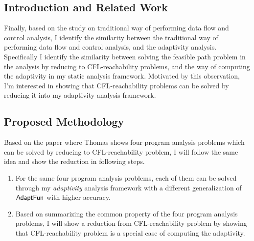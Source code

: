 \subsection{Introduction and Related Work}
\label{subsec:cfl-backgroung}
Finally, based on the study on traditional way of performing data flow and control analysis,
   I identify the similarity between the traditional way of performing data flow and control analysis, and the 
   adaptivity analysis.  
   Specifically I identify the similarity between 
   solving the feasible path problem in the analysis by reducing to CFL-reachability problems,
   and the way of computing the adaptivity in my static analysis framework.
   Motivated by this observation, 
   I'm interested in showing that
   CFL-reachability problems can be solved by reducing it into my adaptivity analysis framework.

\subsection{Proposed Methodology}
\label{subsec:cfl-methodology}
Based on the paper\cite{Reps98} where Thomas shows 
four program analysis problems 
which can be solved by reducing to CFL-reachability problem, I will follow the same idea and show the reduction
in following steps.
\begin{enumerate}
   \item For the same four program analysis problems, each of them 
   can be solved through  my \emph{adaptivity} analysis framework with 
   a different generalization of $\textsf{AdaptFun}$ with higher accuracy.
   \item Based on summarizing the common property of the four program analysis problems,
   I will show a reduction from CFL-reachability problem 
   by showing that CFL-reachability problem is a special case of 
   computing the adaptivity. 
\end{enumerate}

